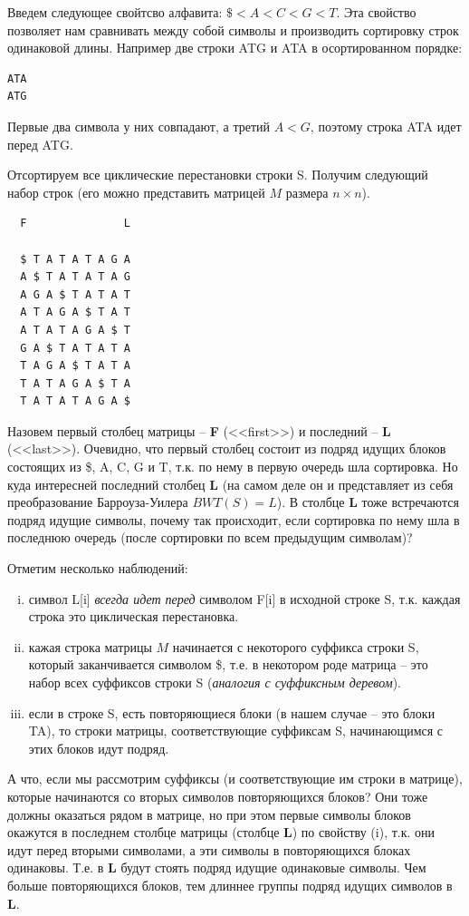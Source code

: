 \documentclass[letterpaper, 11pt]{article}
\begin{document}
Введем следующее свойтсво алфавита: $\$ < A < C < G < T$. Эта свойство позволяет нам сравнивать между собой символы и производить сортировку строк одинаковой длины. Например две строки ATG и ATA в осортированном порядке:

\begin{verbatim}
ATA
ATG
\end{verbatim}

Первые два символа у них совпадают, а третий $A < G$, поэтому строка ATA идет перед ATG.

Отсортируем все циклические перестановки строки S. Получим следующий набор строк (его можно представить матрицей $M$ размера $n \times n$).

\begin{verbatim}
  F               L
  
  $ T A T A T A G A
  A $ T A T A T A G
  A G A $ T A T A T
  A T A G A $ T A T
  A T A T A G A $ T
  G A $ T A T A T A
  T A G A $ T A T A
  T A T A G A $ T A
  T A T A T A G A $
\end{verbatim}

Назовем первый столбец матрицы -- \textbf{F} (<<first>>) и последний -- \textbf{L} (<<last>>). Очевидно, что первый столбец состоит из подряд идущих блоков состоящих из \$, A, C, G и T, т.к. по нему в первую очередь шла сортировка. Но куда интересней последний столбец \textbf{L} (на самом деле он и представляет из себя преобразование Барроуза-Уилера $BWT(S) = L$). В столбце \textbf{L} тоже встречаются подряд идущие символы, почему так происходит, если сортировка по нему шла в последнюю очередь (после сортировки по всем предыдущим символам)?

Отметим несколько наблюдений: 
\begin{enumerate}[(i)]
\item
символ L[i] \textit{всегда идет перед} символом F[i] в исходной строке S, т.к. каждая строка это циклическая перестановка. 
\item
кажая строка матрицы $M$ начинается с некоторого суффикса строки S, который заканчивается символом \$, т.е. в некотором роде матрица -- это набор всех суффиксов строки S (\textit{аналогия с суффиксным деревом}).
\item
если в строке S, есть повторяющиеся блоки (в нашем случае -- это блоки TA), то строки матрицы, соответствующие суффиксам S, начинающимся с этих блоков идут подряд.
\end{enumerate}

А что, если мы рассмотрим суффиксы (и соответствующие им строки в матрице), которые начинаются со вторых символов повторяющихся блоков? Они тоже должны оказаться рядом в матрице, но при этом первые символы блоков окажутся в последнем столбце матрицы (столбце \textbf{L}) по свойству (i), т.к. они идут перед вторыми символами, а эти символы в повторяющихся блоках одинаковы. Т.е. в \textbf{L} будут стоять подряд идущие одинаковые символы. Чем больше повторяющихся блоков, тем длиннее группы подряд идущих символов в \textbf{L}.
\end{document}
